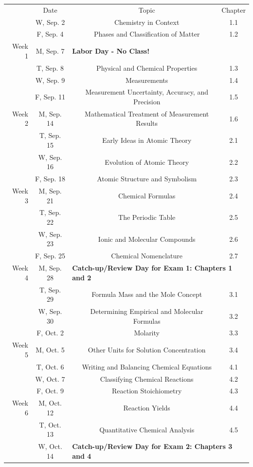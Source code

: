 \begin{tabular}{rcccc}
& Date && Topic & Chapter\\
& W, Sep. 2&& Chemistry in Context & 1.1\\
& F, Sep. 4&& Phases and Classification of Matter & 1.2\\
\midrule
Week 1 & M, Sep. 7& \multicolumn{3}{l}{\textbf{Labor Day - No Class!}}\\
& T, Sep. 8&& Physical and Chemical Properties & 1.3\\
& W, Sep. 9&& Measurements & 1.4\\
& F, Sep. 11&& Measurement Uncertainty, Accuracy, and Precision & 1.5\\
\midrule
Week 2 & M, Sep. 14&& Mathematical Treatment of Measurement Results & 1.6\\
& T, Sep. 15&& Early Ideas in Atomic Theory & 2.1\\
& W, Sep. 16&& Evolution of Atomic Theory & 2.2\\
& F, Sep. 18&& Atomic Structure and Symbolism & 2.3\\
\midrule
Week 3 & M, Sep. 21&& Chemical Formulas & 2.4\\
& T, Sep. 22&& The Periodic Table & 2.5\\
& W, Sep. 23&& Ionic and Molecular Compounds & 2.6\\
& F, Sep. 25&& Chemical Nomenclature & 2.7\\
\midrule
Week 4 & M, Sep. 28& \multicolumn{3}{l}{\textbf{Catch-up/Review Day for Exam 1: Chapters 1 and 2}}\\
& T, Sep. 29&& Formula Mass and the Mole Concept & 3.1\\
& W, Sep. 30&& Determining Empirical and Molecular Formulas & 3.2\\
& F, Oct. 2&& Molarity & 3.3\\
\midrule
Week 5 & M, Oct. 5&& Other Units for Solution Concentration & 3.4\\
& T, Oct. 6&& Writing and Balancing Chemical Equations & 4.1\\
& W, Oct. 7&& Classifying Chemical Reactions & 4.2\\
& F, Oct. 9&& Reaction Stoichiometry & 4.3\\
\midrule
Week 6 & M, Oct. 12&& Reaction Yields & 4.4\\
& T, Oct. 13&& Quantitative Chemical Analysis & 4.5\\
& W, Oct. 14& \multicolumn{3}{l}{\textbf{Catch-up/Review Day for Exam 2: Chapters 3 and 4}}\\

\end{tabular}

